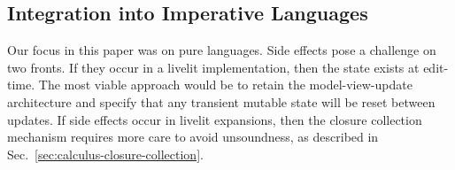 
\subsection{Integration into Imperative Languages}
\label{sec:imperative-langs}
Our focus in this paper was on pure languages.
Side effects pose a challenge on two fronts.
If they occur in a livelit implementation,
then the state exists at edit-time. 
The most viable approach would be to retain the model-view-update
architecture and specify that any transient mutable state will be reset between updates.
If side effects occur in livelit expansions, 
then the closure collection mechanism requires more 
care to avoid unsoundness, as described in Sec.~\ref{sec:calculus-closure-collection}.

